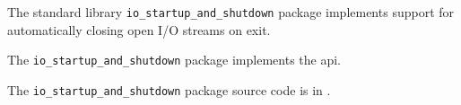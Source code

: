
The standard library {\tt io\_startup\_and\_shutdown} package implements support for automatically closing open I/O streams on exit.

The {\tt io\_startup\_and\_shutdown} package implements the  api.

The {\tt io\_startup\_and\_shutdown} package source code is in .



